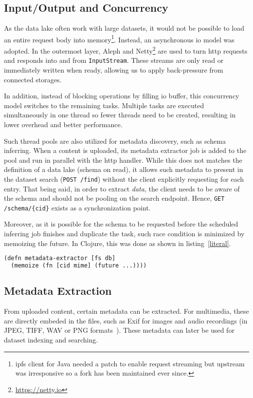 \subsection{Input/Output and Concurrency}\label{future}
As the data lake often work with large datasets, it would not be possible
to load an entire request body into memory\footnote{\gls{ipfs} client for Java
needed a patch to enable request streaming but upstream was irresponsive so a
fork has been maintained ever since.}.  Instead, an asynchronous \gls{io} model
was adopted.  In the outermost layer, Aleph
and Netty\footnote{\url{https://netty.io}} are used to turn \gls{http}
requests and responds into and from \verb|InputStream|.  These streams
are only read or immediately written when ready, allowing us to apply
back-pressure from connected storages.

In addition, instead of blocking operations by filling \gls{io} buffer,
this concurrency model switches to the remaining tasks.  Multiple tasks
are executed simultaneously in one thread so fewer threads need to be created,
resulting in lower overhead and better performance.

Such thread pools are also utilized for metadata discovery, such as
schema inferring.  When a \gls{content} is uploaded, its metadata extractor job
is added to the pool and run in parallel with the \gls{http} handler.
While this does not matches the definition of a data lake (schema on read),
it allows such metadata to present in the dataset search (\verb|POST /find|)
without the client explicitly requesting for each entry.  That being said,
in order to extract \emph{data}, the client needs to be aware of the schema
and should not be pooling on the search endpoint.  Hence,
\verb|GET /schema/{cid}| exists as a synchronization point.

Moreover, as it is possible for the schema to be requested before the scheduled
inferring job finishes and duplicate the task, such race condition is minimized
by memoizing the future.  In Clojure, this was done as shown
in listing~\ref{literal}.
\begin{lstlisting}[label=literal,caption=Constructing
  a metadata extractor,language=lisp]
(defn metadata-extractor [fs db]
  (memoize (fn [cid mime] (future ...))))
\end{lstlisting}

\subsection{Metadata Extraction}
From uploaded content, certain metadata can be extracted.  For multimedia,
these are directly embeded in the files, such as Exif for images
and audio recordings (in JPEG, TIFF, WAV or PNG formats~\cite{exif}).
These metadata can later be used for dataset indexing and searching.

